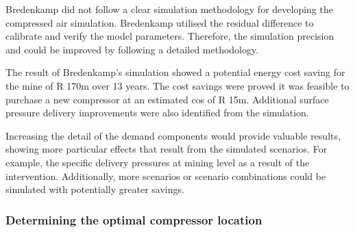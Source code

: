 Bredenkamp did not follow a clear simulation methodology for developing the compressed air simulation. Bredenkamp utilised the residual difference to calibrate and verify the model parameters. Therefore, the simulation precision and could be improved by following a detailed methodology.
\par 
The result of Bredenkamp's simulation showed a potential energy cost saving for the mine of R 170m over 13 years. The cost savings were proved it was feasible to purchase a new compressor at an estimated cos of R 15m. Additional surface pressure delivery improvements were also identified from the simulation.
\par
Increasing the detail of the demand components would provide valuable results, showing more particular effects that result from the simulated scenarios. For example, the specific delivery pressures at mining level as a result of the intervention. Additionally, more scenarios or scenario combinations could be simulated with potentially greater savings.
\subsubsection{Determining the optimal compressor location}

